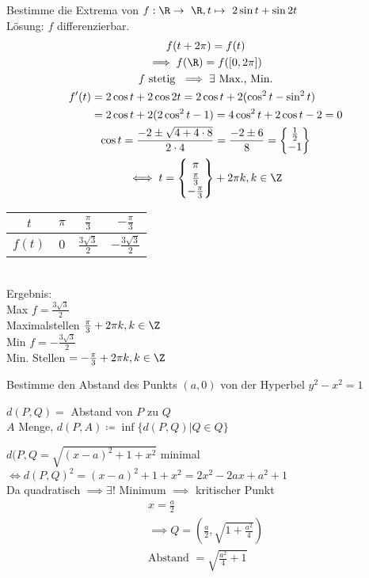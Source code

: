 \begin{bsp}
	Bestimme die Extrema von $f: \R \rightarrow \R, t \mapsto 2 \sin t + \sin 2t$ \\
	Lösung: $f$ differenzierbar. \\
	\begin{gather*}
		f(t+2\pi) = f(t) \\
		\implies f(\R) = f([0,2\pi]) \\
		f \text{ stetig } \implies \exists \text{ Max., Min.} \\
		\begin{split}
			f'(t)	&= 2 \cos t + 2 \cos 2 t = 2 \cos t + 2( \cos^2 t - \sin^2 t) \\
				&= 2 \cos t + 2( 2\cos^2 t - 1) = 4 \cos^2 t + 2 \cos t - 2 = 0
		\end{split}\\
		\cos t = \frac{-2 \pm \sqrt{4 + 4 \cdot 8}}{2 \cdot 4} = \frac{-2 \pm 6}{8} = \begin{Bmatrix}
			\frac{1}{2}	\\
			-1		
		\end{Bmatrix}\\
		\iff t = \begin{Bmatrix}
			\pi			\\
			\frac{\pi}{3}	\\
			-\frac{\pi}{3}	
		\end{Bmatrix} + 2\pi k, k \in \Z
	\end{gather*}
	\begin{tabular}{ | c | c | c | c | }
		\hline
		$t$	&$\pi$	&$\frac{\pi}{3}$		&$-\frac{\pi}{3}$			\\ \hline
		$f(t)$	&$0$		&$\frac{3\sqrt{3}}{2}$	&$-\frac{3\sqrt{3}}{2}$	\\ \hline
	\end{tabular} \\
	Ergebnis:\\
	Max $f = \frac{3\sqrt{3}}{2}$ \\
	Maximalstellen $\frac{\pi}{3} + 2 \pi k, k \in \Z$ \\
	Min $f = -\frac{3\sqrt{3}}{2}$ \\
	Min. Stellen $= -\frac{\pi}{3} + 2 \pi k, k \in \Z$
\end{bsp}
\begin{bsp}
	Bestimme den Abstand des Punkts $(a,0)$ von der Hyperbel $y^2 - x^2 = 1$ \\
	\begin{bem}
		$d(P,Q) =$ Abstand von $P$ zu $Q$ \\
		$A$ Menge, $d(P,A) \coloneqq \inf\{ d(P,Q) | Q \in Q \}$
	\end{bem}
	$d(P,Q = \sqrt{(x-a)^2 + 1 + x^2}$ minimal \\
	$\iff d(P,Q)^2 = (x-a)^2 + 1 + x^2 = 2x^2 - 2ax + a^2 + 1$\\
	Da quadratisch $\implies \exists !$ Minimum $\implies$ kritischer Punkt \\
	\begin{gather*}
		x = \frac{a}{2} \\
		\implies Q = (\frac{a}{2} , \sqrt{1 + \frac{a^2}{4}}) \\
		\text{Abstand } = \sqrt{ \frac{a^2}{4} + 1}
	\end{gather*}
\end{bsp}
